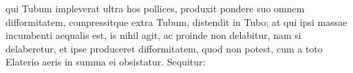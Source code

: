                          qui Tubum impleverat ultra hos pollices, produxit pondere\protect{} suo omnem difformitatem, compressitque  extra Tubum, distendit in Tubo; at qui ipsi massae\protect{}  incumbenti aequalis est, is nihil agit, ac proinde non delabitur,  nam si delaberetur, et ipse produceret difformitatem, quod non  potest, cum a toto Elaterio\protect{} aeris in summa ei obsistatur. Sequitur: